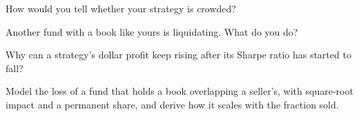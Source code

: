 \begin{interviewq}\label{iq:rs:capacity-decay-and-crowding:3}
How would you tell whether your strategy is crowded?
\end{interviewq}

\begin{interviewq}\label{iq:rs:capacity-decay-and-crowding:4}
Another fund with a book like yours is liquidating. What do you do?
\end{interviewq}

\begin{interviewq}\label{iq:rs:capacity-decay-and-crowding:5}
Why can a strategy's dollar profit keep rising after its Sharpe ratio has started to fall?
\end{interviewq}

\begin{interviewq}\label{iq:rs:capacity-decay-and-crowding:6}
Model the loss of a fund that holds a book overlapping a seller's, with square-root impact and a permanent share, and derive how it scales with the fraction sold.
\end{interviewq}
